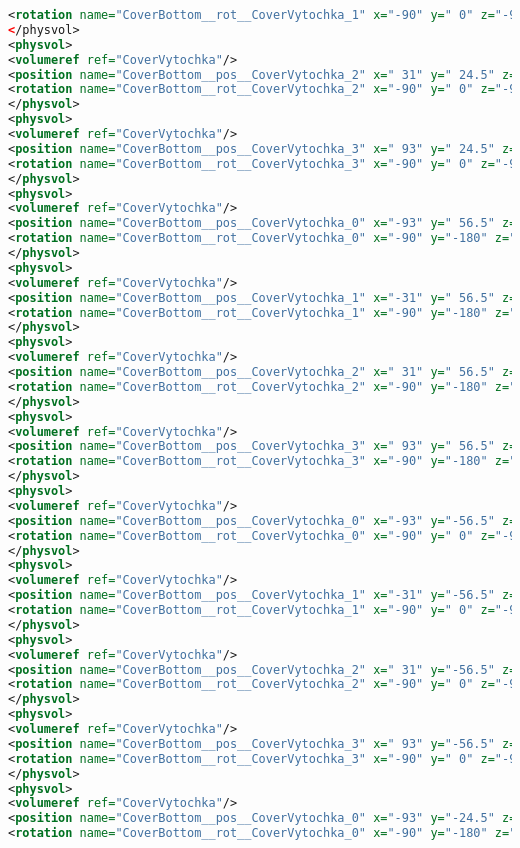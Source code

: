 \begin{lstlisting}[language=XML, firstline=1, lastline=89]
<rotation name="CoverBottom__rot__CoverVytochka_1" x="-90" y=" 0" z="-90" unit="deg"/>
</physvol>
<physvol>
<volumeref ref="CoverVytochka"/>
<position name="CoverBottom__pos__CoverVytochka_2" x=" 31" y=" 24.5" z=" 1" unit="mm"/>
<rotation name="CoverBottom__rot__CoverVytochka_2" x="-90" y=" 0" z="-90" unit="deg"/>
</physvol>
<physvol>
<volumeref ref="CoverVytochka"/>
<position name="CoverBottom__pos__CoverVytochka_3" x=" 93" y=" 24.5" z=" 1" unit="mm"/>
<rotation name="CoverBottom__rot__CoverVytochka_3" x="-90" y=" 0" z="-90" unit="deg"/>
</physvol>
<physvol>
<volumeref ref="CoverVytochka"/>
<position name="CoverBottom__pos__CoverVytochka_0" x="-93" y=" 56.5" z=" 1" unit="mm"/>
<rotation name="CoverBottom__rot__CoverVytochka_0" x="-90" y="-180" z="-90" unit="deg"/>
</physvol>
<physvol>
<volumeref ref="CoverVytochka"/>
<position name="CoverBottom__pos__CoverVytochka_1" x="-31" y=" 56.5" z=" 1" unit="mm"/>
<rotation name="CoverBottom__rot__CoverVytochka_1" x="-90" y="-180" z="-90" unit="deg"/>
</physvol>
<physvol>
<volumeref ref="CoverVytochka"/>
<position name="CoverBottom__pos__CoverVytochka_2" x=" 31" y=" 56.5" z=" 1" unit="mm"/>
<rotation name="CoverBottom__rot__CoverVytochka_2" x="-90" y="-180" z="-90" unit="deg"/>
</physvol>
<physvol>
<volumeref ref="CoverVytochka"/>
<position name="CoverBottom__pos__CoverVytochka_3" x=" 93" y=" 56.5" z=" 1" unit="mm"/>
<rotation name="CoverBottom__rot__CoverVytochka_3" x="-90" y="-180" z="-90" unit="deg"/>
</physvol>
<physvol>
<volumeref ref="CoverVytochka"/>
<position name="CoverBottom__pos__CoverVytochka_0" x="-93" y="-56.5" z=" 1" unit="mm"/>
<rotation name="CoverBottom__rot__CoverVytochka_0" x="-90" y=" 0" z="-90" unit="deg"/>
</physvol>
<physvol>
<volumeref ref="CoverVytochka"/>
<position name="CoverBottom__pos__CoverVytochka_1" x="-31" y="-56.5" z=" 1" unit="mm"/>
<rotation name="CoverBottom__rot__CoverVytochka_1" x="-90" y=" 0" z="-90" unit="deg"/>
</physvol>
<physvol>
<volumeref ref="CoverVytochka"/>
<position name="CoverBottom__pos__CoverVytochka_2" x=" 31" y="-56.5" z=" 1" unit="mm"/>
<rotation name="CoverBottom__rot__CoverVytochka_2" x="-90" y=" 0" z="-90" unit="deg"/>
</physvol>
<physvol>
<volumeref ref="CoverVytochka"/>
<position name="CoverBottom__pos__CoverVytochka_3" x=" 93" y="-56.5" z=" 1" unit="mm"/>
<rotation name="CoverBottom__rot__CoverVytochka_3" x="-90" y=" 0" z="-90" unit="deg"/>
</physvol>
<physvol>
<volumeref ref="CoverVytochka"/>
<position name="CoverBottom__pos__CoverVytochka_0" x="-93" y="-24.5" z=" 1" unit="mm"/>
<rotation name="CoverBottom__rot__CoverVytochka_0" x="-90" y="-180" z="-90" unit="deg"/>

\end{lstlisting}
